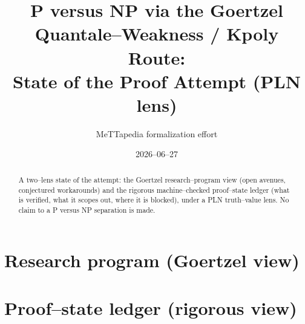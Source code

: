 \documentclass[11pt]{report}
\title{P versus NP via the Goertzel Quantale--Weakness / Kpoly Route:\\ State of the Proof Attempt (PLN lens)}
\author{MeTTapedia formalization effort}
\date{2026--06--27}
\begin{document}
\maketitle
\begin{abstract}
A two--lens state of the attempt: the Goertzel research--program view (open avenues,
conjectured workarounds) and the rigorous machine--checked proof--state ledger (what is
verified, what it scopes out, where it is blocked), under a PLN truth--value lens. No
claim to a P versus NP separation is made.
\end{abstract}
\chapter{Research program (Goertzel view)}

\chapter{Proof--state ledger (rigorous view)}

\end{document}
